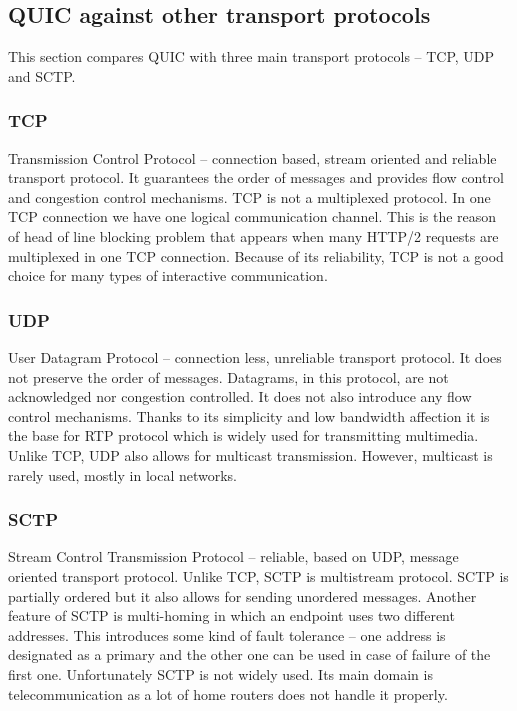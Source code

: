 \subsection{QUIC against other transport protocols}
\label{subsec:quic_against_other_transport_protocols}
This section compares QUIC with three main transport protocols -- TCP, UDP and SCTP\@.

\subsubsection{TCP}
Transmission Control Protocol -- connection based, stream oriented and reliable transport protocol.
It guarantees the order of messages and provides flow control and congestion control mechanisms.
TCP is not a multiplexed protocol.
In one TCP connection we have one logical communication channel.
This is the reason of head of line blocking problem that appears when many HTTP/2 requests are multiplexed in one TCP connection.
Because of its reliability, TCP is not a good choice for many types of interactive communication.

\subsubsection{UDP}
User Datagram Protocol -- connection less, unreliable transport protocol.
It does not preserve the order of messages.
Datagrams, in this protocol, are not acknowledged nor congestion controlled.
It does not also introduce any flow control mechanisms.
Thanks to its simplicity and low bandwidth affection it is the base for RTP protocol which is widely used for transmitting multimedia.
Unlike TCP, UDP also allows for multicast transmission.
However, multicast is rarely used, mostly in local networks.

\subsubsection{SCTP}
Stream Control Transmission Protocol -- reliable, based on UDP, message oriented transport protocol.
Unlike TCP, SCTP is multistream protocol.
SCTP is partially ordered but it also allows for sending unordered messages.
Another feature of SCTP is multi-homing in which an endpoint uses two different addresses.
This introduces some kind of fault tolerance -- one address is designated as a primary and the other one can be used in case of failure of the first one.
Unfortunately SCTP is not widely used.
Its main domain is telecommunication as a lot of home routers does not handle it properly.

